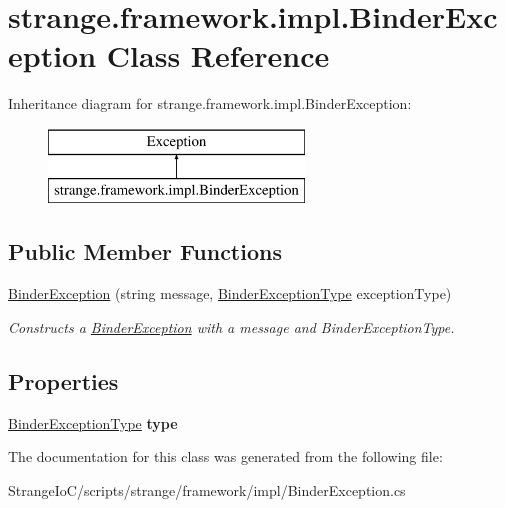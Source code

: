 \hypertarget{classstrange_1_1framework_1_1impl_1_1_binder_exception}{\section{strange.\-framework.\-impl.\-Binder\-Exception Class Reference}
\label{classstrange_1_1framework_1_1impl_1_1_binder_exception}
}
Inheritance diagram for strange.\-framework.\-impl.\-Binder\-Exception\-:\begin{figure}[H]
\begin{center}
\leavevmode
\includegraphics[height=2.000000cm]{classstrange_1_1framework_1_1impl_1_1_binder_exception}
\end{center}
\end{figure}
\subsection*{Public Member Functions}
\begin{DoxyCompactItemize}
\item 
\hypertarget{classstrange_1_1framework_1_1impl_1_1_binder_exception_acabaa6f293cca63d97cc417e454c3953}{\hyperlink{classstrange_1_1framework_1_1impl_1_1_binder_exception_acabaa6f293cca63d97cc417e454c3953}{Binder\-Exception} (string message, \hyperlink{namespacestrange_1_1framework_1_1api_ae9308e863579d2ca38f2729e1104dac9}{Binder\-Exception\-Type} exception\-Type)}\label{classstrange_1_1framework_1_1impl_1_1_binder_exception_acabaa6f293cca63d97cc417e454c3953}

\begin{DoxyCompactList}\small\item\em Constructs a \hyperlink{classstrange_1_1framework_1_1impl_1_1_binder_exception}{Binder\-Exception} with a message and Binder\-Exception\-Type. \end{DoxyCompactList}\end{DoxyCompactItemize}
\subsection*{Properties}
\begin{DoxyCompactItemize}
\item 
\hypertarget{classstrange_1_1framework_1_1impl_1_1_binder_exception_a32626a8fc91be29732b6b54cf6942fc6}{\hyperlink{namespacestrange_1_1framework_1_1api_ae9308e863579d2ca38f2729e1104dac9}{Binder\-Exception\-Type} {\bfseries type}}\label{classstrange_1_1framework_1_1impl_1_1_binder_exception_a32626a8fc91be29732b6b54cf6942fc6}

\end{DoxyCompactItemize}


The documentation for this class was generated from the following file\-:\begin{DoxyCompactItemize}
\item 
Strange\-Io\-C/scripts/strange/framework/impl/Binder\-Exception.\-cs\end{DoxyCompactItemize}

